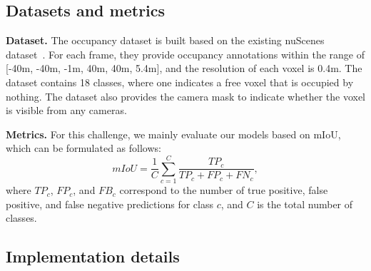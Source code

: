 \documentclass[10pt,twocolumn,letterpaper]{article}
\begin{document}
\subsection{Datasets and metrics}
\noindent\textbf{Dataset.} The occupancy dataset is built based on the existing nuScenes dataset~\cite{tian2023occ3d,caesar2020nuscenes}. For each frame, they provide occupancy annotations within the range of [-40m, -40m, -1m, 40m, 40m, 5.4m], and the resolution of each voxel is 0.4m. The dataset contains 18 classes, where one indicates a free voxel that is occupied by nothing. The dataset also provides the camera mask to indicate whether the voxel is visible from any cameras.

\vspace{2mm}
\noindent\textbf{Metrics.} For this challenge, we mainly evaluate our models based on mIoU, which can be formulated as follows:
\begin{equation}
    mIoU = \frac{1}{C}\sum_{c=1}^{C}\frac{TP_c}{TP_c+FP_c+FN_c},
\end{equation}
where $TP_c$, $FP_c$, and $FB_c$ correspond to the number of true positive, false positive, and false negative predictions for class $c$, and $C$ is the total number of classes.

\subsection{Implementation details}
\end{document}
